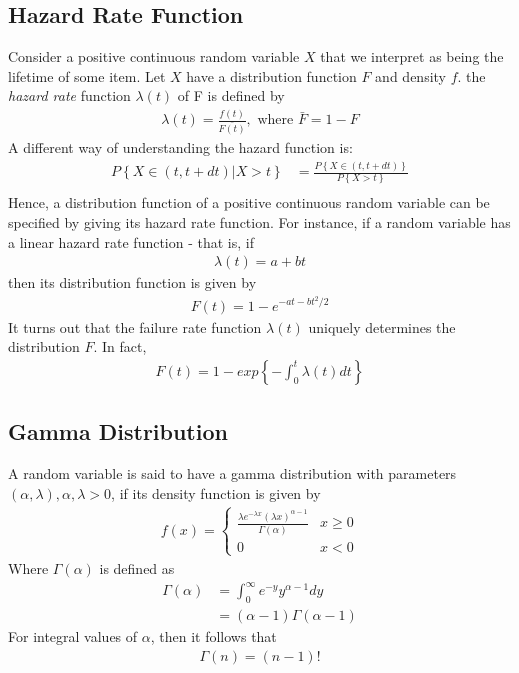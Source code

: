 \documentclass[a4paper]{article}
\begin{document}
\subsection{Hazard Rate Function} %
\label{sub:Hazard Rate Function}
Consider a positive continuous random variable $X$ that we interpret as being the lifetime of some item. Let $X$ have a distribution function $F$ and density $f$. the \emph{hazard rate} function $\lambda(t)$ of F is defined by
\begin{align}
  \lambda(t) = \frac{f(t)}{\bar{F(t)}}, \text{ where } \bar{F} = 1-F
\end{align}
A different way of understanding the hazard function is:
\begin{align}
  P\left\{ X \in (t,t+dt)| X > t \right\} & = \frac{P\left\{ X \in (t,t+dt) \right\}}{P\left\{ X>t \right\}} \\
\end{align}
Hence, a distribution function of a positive continuous random variable can be specified by giving its hazard rate function. For instance, if a random variable has a linear hazard rate function - that is, if 
\begin{align}
  \lambda(t) = a+bt
\end{align}
then its distribution function is given by 
\begin{align}
  F(t) = 1- e^{-at-bt^2/2}
\end{align}
It turns out that the failure rate function $\lambda(t)$ uniquely determines the distribution $F$. In fact,
\begin{align}
  F(t) = 1 - exp \left\{  -\int_{0}^{t}\lambda(t)dt\right\}
\end{align}
\subsection{Gamma Distribution} %
\label{sub:Gamma Distribution}
A random variable is said to have a gamma distribution with parameters $(\alpha,\lambda), \alpha,\lambda>0$, if its density function is given by
\begin{align}
  f(x) = 
  \begin{cases}
    \frac{\lambda e^{-\lambda x}(\lambda x)^{\alpha-1}}{\Gamma(\alpha)} & x \geq 0 \\
    0 & x < 0
  \end{cases}
\end{align}
Where $\Gamma(\alpha)$ is defined as 
\begin{align}
  \Gamma(\alpha) & = \int_{0}^{\infty} e^{-y}y^{\alpha-1} dy \\
  & = (\alpha-1) \Gamma(\alpha-1)
\end{align}
For integral values of $\alpha$, then it follows that
\begin{align}
  \Gamma(n) = (n-1)!
\end{align}
\end{document}
